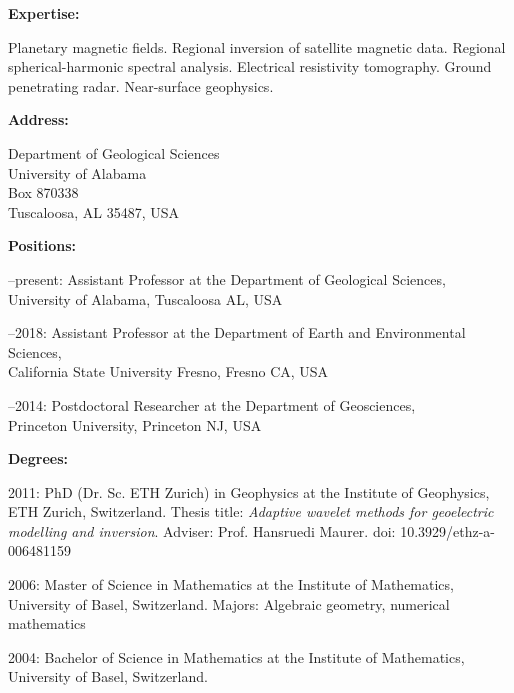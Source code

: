 \documentclass[10pt]{article}
\begin{document}
\spc
\textbf{\tsize Expertise:}

\spcp Planetary magnetic fields. Regional inversion of satellite
magnetic data. Regional spherical-harmonic spectral analysis.
Electrical resistivity tomography. Ground penetrating radar. Near-surface geophysics.

\spc
\textbf{\tsize Address:}

\spcp
Department of Geological Sciences\\
University of Alabama\\
Box 870338\\
Tuscaloosa, AL 35487, USA



\spc
\textbf{\tsize Positions:}

--present:
Assistant Professor at the Department of Geological Sciences, \\University of Alabama, Tuscaloosa AL, USA

--2018:
Assistant Professor at the Department of Earth and Environmental Sciences, \\California State University Fresno, Fresno CA, USA

--2014:
Postdoctoral Researcher at the Department of Geosciences, \\Princeton University, Princeton NJ, USA


\spc
\textbf{\tsize Degrees:}

\spcp
\par{2011:} PhD (Dr. Sc. ETH Zurich) in Geophysics at the Institute of Geophysics,
ETH Zurich, Switzerland.
Thesis title: \emph{ Adaptive wavelet methods for geoelectric modelling and inversion}.
Adviser: Prof. Hansruedi Maurer.
doi: 10.3929/ethz-a-006481159

\spcp
\par{2006:} Master of Science in Mathematics at the Institute of Mathematics,
 University of Basel, Switzerland.
 Majors: Algebraic geometry, numerical mathematics

 \spcp
\par{ 2004:} Bachelor of Science in Mathematics at the Institute of Mathematics, 
University of Basel, Switzerland.
\end{document}

